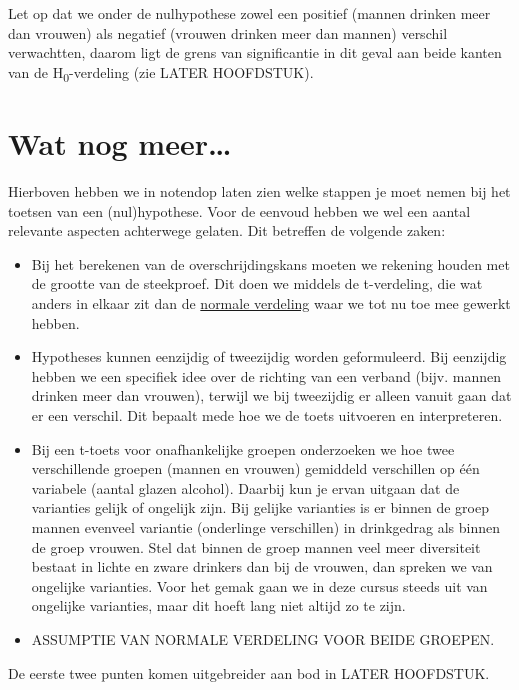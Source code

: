 \documentclass[
  letterpaper,
  DIV=11,
  numbers=noendperiod]{scrreprt}
\providecommand{\tightlist}{%
  \setlength{\itemsep}{0pt}\setlength{\parskip}{0pt}}
\begin{document}
Let op dat we onder de nulhypothese zowel een positief (mannen drinken
meer dan vrouwen) als negatief (vrouwen drinken meer dan mannen)
verschil verwachtten, daarom ligt de grens van significantie in dit
geval aan beide kanten van de H\textsubscript{0}-verdeling (zie LATER
HOOFDSTUK).

\section{Wat nog meer\ldots{}}\label{wat-nog-meer}

Hierboven hebben we in notendop laten zien welke stappen je moet nemen
bij het toetsen van een (nul)hypothese. Voor de eenvoud hebben we wel
een aantal relevante aspecten achterwege gelaten. Dit betreffen de
volgende zaken:

\begin{itemize}
\tightlist
\item
  Bij het berekenen van de overschrijdingskans moeten we rekening houden
  met de grootte van de steekproef. Dit doen we middels de t-verdeling,
  die wat anders in elkaar zit dan de
  \hyperref[sec-normaleverdeling]{normale verdeling} waar we tot nu toe
  mee gewerkt hebben.
\item
  Hypotheses kunnen eenzijdig of tweezijdig worden geformuleerd. Bij
  eenzijdig hebben we een specifiek idee over de richting van een
  verband (bijv. mannen drinken meer dan vrouwen), terwijl we bij
  tweezijdig er alleen vanuit gaan dat er een verschil. Dit bepaalt mede
  hoe we de toets uitvoeren en interpreteren.
\item
  Bij een t-toets voor onafhankelijke groepen onderzoeken we hoe twee
  verschillende groepen (mannen en vrouwen) gemiddeld verschillen op één
  variabele (aantal glazen alcohol). Daarbij kun je ervan uitgaan dat de
  varianties gelijk of ongelijk zijn. Bij gelijke varianties is er
  binnen de groep mannen evenveel variantie (onderlinge verschillen) in
  drinkgedrag als binnen de groep vrouwen. Stel dat binnen de groep
  mannen veel meer diversiteit bestaat in lichte en zware drinkers dan
  bij de vrouwen, dan spreken we van ongelijke varianties. Voor het
  gemak gaan we in deze cursus steeds uit van ongelijke varianties, maar
  dit hoeft lang niet altijd zo te zijn.
\item
  ASSUMPTIE VAN NORMALE VERDELING VOOR BEIDE GROEPEN.
\end{itemize}

De eerste twee punten komen uitgebreider aan bod in LATER HOOFDSTUK.
\end{document}
